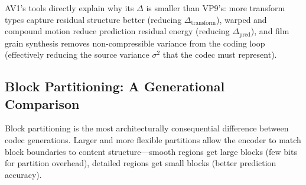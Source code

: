 AV1's tools directly explain why its $\Delta$ is smaller than VP9's:
more transform types capture residual structure better (reducing
$\Delta_{\text{transform}}$), warped and compound motion reduce prediction
residual energy (reducing $\Delta_{\text{pred}}$), and film grain synthesis
removes non-compressible variance from the coding loop (effectively
reducing the source variance $\sigma^2$ that the codec must represent).

\subsection{Block Partitioning: A Generational Comparison}
\label{sec:partitioning}

Block partitioning is the most architecturally consequential difference
between codec generations. Larger and more flexible partitions allow the
encoder to match block boundaries to content structure---smooth regions
get large blocks (few bits for partition overhead), detailed regions get
small blocks (better prediction accuracy).

